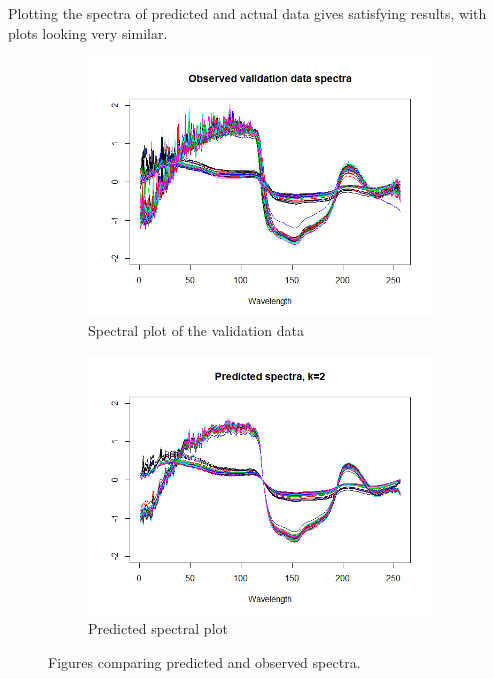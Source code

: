 \documentclass[12pt]{article}
\begin{document}
Plotting the spectra of predicted and actual data gives satisfying results, with plots looking very similar.
\begin{figure}[h!]
  \begin{subfigure}[b]{0.5\linewidth}
      \centering
      \includegraphics[width=\textwidth]{../images/validDataSpectra.png}
   \caption{Spectral plot of the validation data}\label{fig:validDataSpectra}
  \end{subfigure}%
  \begin{subfigure}[b]{0.5\linewidth}
      \centering
   \includegraphics[width=\textwidth]{../images/predictedSpectra.png}
   \caption{Predicted spectral plot}\label{fig:predictedSpectra}
  \end{subfigure}%
 \caption{Figures comparing predicted and observed spectra.}
\end{figure}
\end{document}
